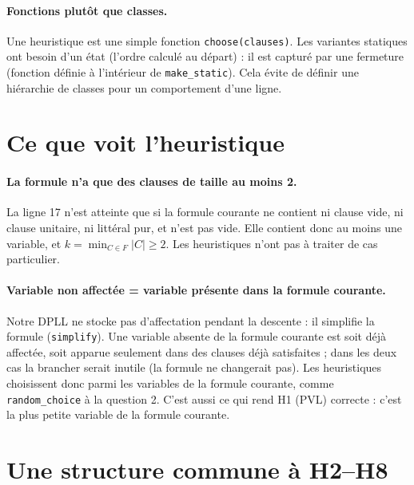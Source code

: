 \documentclass[11pt,a4paper]{article}
\begin{document}
\paragraph{Fonctions plutôt que classes.} Une heuristique est une simple
fonction \texttt{choose(clauses)}. Les variantes statiques ont besoin d'un
état (l'ordre calculé au départ) : il est capturé par une fermeture
(fonction définie à l'intérieur de \texttt{make\_static}). Cela évite de
définir une hiérarchie de classes pour un comportement d'une ligne.

\section{Ce que voit l'heuristique}

\paragraph{La formule n'a que des clauses de taille au moins 2.} La ligne 17
n'est atteinte que si la formule courante ne contient ni clause vide, ni
clause unitaire, ni littéral pur, et n'est pas vide. Elle contient donc au
moins une variable, et $k = \min_{C \in F} |C| \geq 2$. Les heuristiques
n'ont pas à traiter de cas particulier.

\paragraph{\og Variable non affectée \fg{} = variable présente dans la
formule courante.} Notre DPLL ne stocke pas d'affectation pendant la
descente : il simplifie la formule (\texttt{simplify}). Une variable absente
de la formule courante est soit déjà affectée, soit apparue seulement dans
des clauses déjà satisfaites ; dans les deux cas la brancher serait inutile
(la formule ne changerait pas). Les heuristiques choisissent donc parmi les
variables de la formule courante, comme \texttt{random\_choice} à la
question 2. C'est aussi ce qui rend H1 (PVL) correcte : c'est la plus petite
variable de la formule courante.

\section{Une structure commune à H2--H8}
\end{document}
